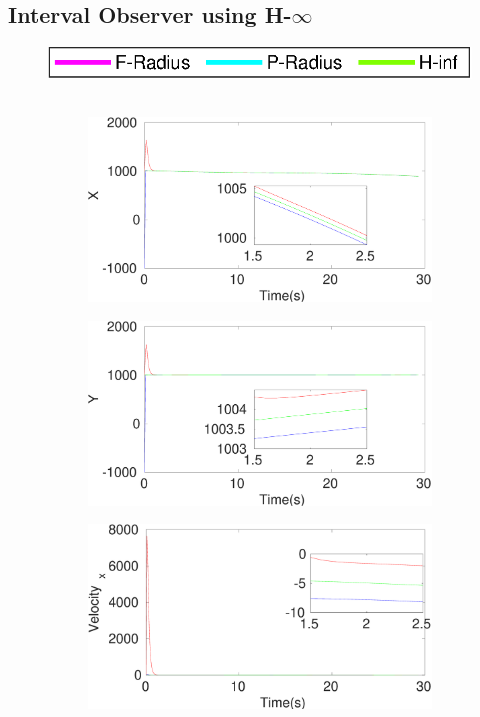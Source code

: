\clearpage
\subsection{Interval Observer using H-$\infty$}\label{eresult:hinf}
\FloatBarrier
\begin{figure}[h]
\includegraphics[scale=0.8]{figures/ratelegend}\\\\
\begin{subfigure}{.5\linewidth}
\centering
\includegraphics[width=\linewidth]{figures/HInf/s3cvHInfX}
\end{subfigure}
\begin{subfigure}{.5\linewidth}
\centering
\includegraphics[width=\linewidth]{figures/HInf/s3cvHInfY}
\end{subfigure}
\begin{subfigure}{.5\linewidth}
\centering
\includegraphics[width=\linewidth]{figures/HInf/s3cvHInfVelocity_x}

\end{subfigure}
\end{figure}
